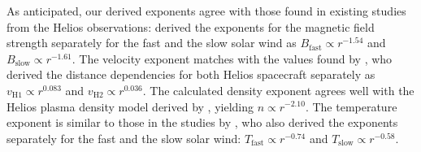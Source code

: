 As anticipated, our derived exponents agree with those found in existing studies from the Helios observations: \citet{Mariani1978} derived the exponents for the magnetic field strength separately for the fast and the slow solar wind as $B_\text{fast} \propto r^{-1.54}$ and $B_\text{slow} \propto r^{-1.61}$.
The velocity exponent matches with the values found by \citet{Schwenn1983,Schwenn1990}, who derived the distance dependencies for both Helios spacecraft separately as $v_\text{H1} \propto r^{0.083}$ and $v_\text{H2} \propto r^{0.036}$. The calculated density exponent agrees well with the Helios plasma density model derived by \citet{Bougeret1984}, yielding $n \propto r^{-2.10}$.
The temperature exponent is similar to those in the studies by \citet{Hellinger2011,Hellinger2013}, who also derived the exponents separately for the fast and the slow solar wind: $T_\text{fast} \propto r^{-0.74}$ and $T_\text{slow} \propto r^{-0.58}$.


